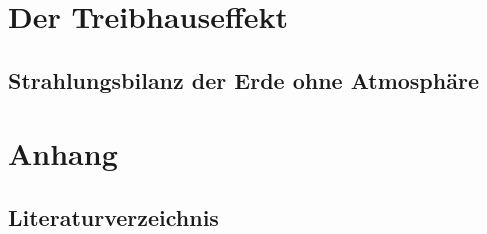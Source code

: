 \documentclass[12pt,a4paper]{article}
\begin{document}
\section{Der Treibhauseffekt}

\subsection{Strahlungsbilanz der Erde ohne Atmosphäre}

\newpage
\section{Anhang}

\subsection{Literaturverzeichnis}
\printbibliography[heading=none]

\end{document}
